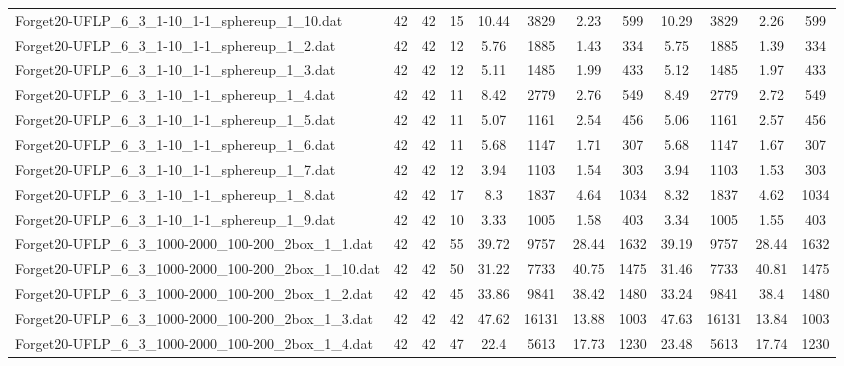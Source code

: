 \begin{sidewaystable}[!ht]
{\begin{tabular}{lccccccccccc}
Forget20-UFLP\_6\_3\_1-10\_1-1\_sphereup\_1\_10.dat & 42 & 42 & 15 & 10.44 & 3829 &  \textcolor{blue2}{2.23} & 599 & 10.29 & 3829 & 2.26 & 599 \\
Forget20-UFLP\_6\_3\_1-10\_1-1\_sphereup\_1\_2.dat & 42 & 42 & 12 & 5.76 & 1885 & 1.43 & 334 & 5.75 & 1885 &  \textcolor{blue2}{1.39} & 334 \\
Forget20-UFLP\_6\_3\_1-10\_1-1\_sphereup\_1\_3.dat & 42 & 42 & 12 & 5.11 & 1485 & 1.99 & 433 & 5.12 & 1485 &  \textcolor{blue2}{1.97} & 433 \\
Forget20-UFLP\_6\_3\_1-10\_1-1\_sphereup\_1\_4.dat & 42 & 42 & 11 & 8.42 & 2779 & 2.76 & 549 & 8.49 & 2779 &  \textcolor{blue2}{2.72} & 549 \\
Forget20-UFLP\_6\_3\_1-10\_1-1\_sphereup\_1\_5.dat & 42 & 42 & 11 & 5.07 & 1161 &  \textcolor{blue2}{2.54} & 456 & 5.06 & 1161 & 2.57 & 456 \\
Forget20-UFLP\_6\_3\_1-10\_1-1\_sphereup\_1\_6.dat & 42 & 42 & 11 & 5.68 & 1147 & 1.71 & 307 & 5.68 & 1147 &  \textcolor{blue2}{1.67} & 307 \\
Forget20-UFLP\_6\_3\_1-10\_1-1\_sphereup\_1\_7.dat & 42 & 42 & 12 & 3.94 & 1103 & 1.54 & 303 & 3.94 & 1103 &  \textcolor{blue2}{1.53} & 303 \\
Forget20-UFLP\_6\_3\_1-10\_1-1\_sphereup\_1\_8.dat & 42 & 42 & 17 & 8.3 & 1837 & 4.64 & 1034 & 8.32 & 1837 & 4.62 & 1034 \\
Forget20-UFLP\_6\_3\_1-10\_1-1\_sphereup\_1\_9.dat & 42 & 42 & 10 & 3.33 & 1005 & 1.58 & 403 & 3.34 & 1005 &  \textcolor{blue2}{1.55} & 403 \\
Forget20-UFLP\_6\_3\_1000-2000\_100-200\_2box\_1\_1.dat & 42 & 42 & 55 & 39.72 & 9757 &  \textcolor{blue2}{28.44} & 1632 & 39.19 & 9757 &  \textcolor{blue2}{28.44} & 1632 \\
Forget20-UFLP\_6\_3\_1000-2000\_100-200\_2box\_1\_10.dat & 42 & 42 & 50 &  \textcolor{blue2}{31.22} & 7733 & 40.75 & 1475 & 31.46 & 7733 & 40.81 & 1475 \\
Forget20-UFLP\_6\_3\_1000-2000\_100-200\_2box\_1\_2.dat & 42 & 42 & 45 & 33.86 & 9841 & 38.42 & 1480 &  \textcolor{blue2}{33.24} & 9841 & 38.4 & 1480 \\
Forget20-UFLP\_6\_3\_1000-2000\_100-200\_2box\_1\_3.dat & 42 & 42 & 42 & 47.62 & 16131 & 13.88 & 1003 & 47.63 & 16131 &  \textcolor{blue2}{13.84} & 1003 \\
Forget20-UFLP\_6\_3\_1000-2000\_100-200\_2box\_1\_4.dat & 42 & 42 & 47 & 22.4 & 5613 &  \textcolor{blue2}{17.73} & 1230 & 23.48 & 5613 & 17.74 & 1230 \\

\end{tabular}}
\end{sidewaystable}
